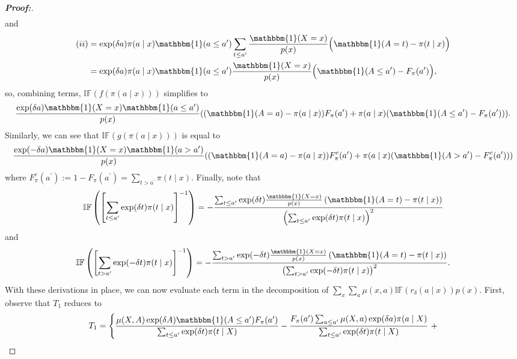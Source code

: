 \documentclass[11pt,twoside]{article}
\theoremstyle{definition}
\theoremstyle{remark}
\begin{document}
\begin{proof}[\textbf{Proof:}]
\begin{align*}
\end{align*}
and
\begin{align*}
    (ii) &= \exp(\delta a) \pi(a \mid x) \mathbbm{1}(a \leq a^\prime) \sum_{t \leq a^\prime} \frac{\mathbbm{1}(X = x)}{p(x)} \Big( \mathbbm{1}(A = t) - \pi(t \mid x) \Big) \\
    &= \exp(\delta a) \pi(a \mid x) \mathbbm{1}(a \leq a^\prime)  \frac{\mathbbm{1}(X = x)}{p(x)} \Big( \mathbbm{1}(A \leq a^\prime) -  F_{\pi}(a^\prime) \Big),
\end{align*}
so, combining terms, $ \mathbb{IF}(f(\pi(a \mid x)))$ simplifies to
\begin{align*}
     \frac{\exp(\delta a) \mathbbm{1}(X = x) \mathbbm{1}(a \leq a^\prime)}{p(x)} ( (\mathbbm{1}(A = a) - \pi(a \mid x)) F_{\pi}(a^\prime) + \pi(a \mid x) (\mathbbm{1}(A \leq a^\prime) -  F_{\pi}(a^\prime) ) ).
\end{align*}
Similarly, we can see that $\mathbb{IF}(g(\pi(a \mid x)))$ is equal to
\begin{align*}
     \frac{\exp(-\delta a) \mathbbm{1}(X = x) \mathbbm{1}(a > a^\prime)}{p(x)} ((\mathbbm{1}(A = a) - \pi(a \mid x)) F^c_{\pi}(a^\prime) + \pi(a \mid x) (\mathbbm{1}(A > a^\prime) - F^c_{\pi}(a^\prime)))
\end{align*}
where $F^c_{\pi}(a^\prime) := 1 - F_{\pi}(a^\prime) = \sum_{t > a^\prime} \pi(t \mid x)$. Finally, note that
\begin{align*}
     \mathbb{IF}\left( \left[\sum_{t \leq a^\prime} \text{exp}(\delta t) \pi(t \mid x) \right]^{-1} \right) = -\frac{\sum_{t \leq a^\prime} \text{exp}(\delta t) \frac{\mathbbm{1}(X=x)}{p(x)} \left( \mathbbm{1}(A = t) - \pi(t \mid x) \right)}{\left(\sum_{t \leq a^\prime} \text{exp}(\delta t) \pi(t \mid x) \right)^2}
\end{align*}
and
\begin{align*}
    \mathbb{IF}\left( \left[\sum_{t > a^\prime} \text{exp}(- \delta t) \pi(t \mid x) \right]^{-1} \right) = -\frac{\sum_{t > a^\prime} \text{exp}(-\delta t) \frac{\mathbbm{1}(X=x)}{p(x)} \left( \mathbbm{1}(A = t) - \pi(t \mid x) \right)}{\left(\sum_{t > a^\prime} \text{exp}(- \delta t) \pi(t \mid x) \right)^2}.
\end{align*}
With these derivations in place, we can now evaluate each term in the decomposition of $\sum_x \sum_a  \mu(x, a)\mathbb{IF}(r_\delta(a \mid x)) p(x)$. First, observe that $T_1$ reduces to
\begin{align*}
    T_1 &= \Bigg\{\frac{\mu(X, A) \exp(\delta A) \mathbbm{1}(A \leq a^{\prime})  F_{\pi}(a^{\prime})}{\sum_{t \leq a^{\prime}} \text{exp}(\delta t) \pi(t \mid X)} - \frac{F_{\pi}(a^{\prime}) \sum_{a \leq a^{\prime}} \mu(X, a) \exp(\delta a) \pi(a \mid X)  }{\sum_{t \leq a^{\prime}} \text{exp}(\delta t) \pi(t \mid X)} \ +\\

\end{align*}
\end{proof}
\end{document}
